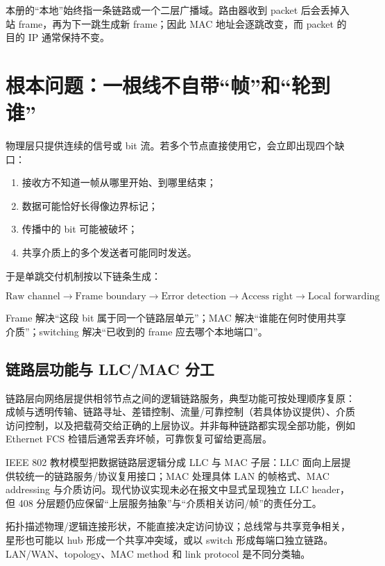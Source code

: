 \documentclass[UTF8,fontset=none,11pt,a4paper]{ctexart}
\providecommand{\tightlist}{\setlength{\itemsep}{0pt}\setlength{\parskip}{0pt}}
\begin{document}
本册的“本地”始终指一条链路或一个二层广播域。路由器收到 packet 后会丢掉入站
frame，再为下一跳生成新 frame；因此 MAC 地址会逐跳改变，而 packet 的目的 IP
通常保持不变。

\section{根本问题：一根线不自带``帧''和``轮到谁''}\label{1-ux6839ux672cux95eeux9898ux4e00ux6839ux7ebfux4e0dux81eaux5e26ux5e27ux548cux8f6eux5230ux8c01}

物理层只提供连续的信号或 bit
流。若多个节点直接使用它，会立即出现四个缺口：

\begin{enumerate}
\def\labelenumi{\arabic{enumi}.}
\tightlist
\item
  接收方不知道一帧从哪里开始、到哪里结束；
\item
  数据可能恰好长得像边界标记；
\item
  传播中的 bit 可能被破坏；
\item
  共享介质上的多个发送者可能同时发送。
\end{enumerate}

于是单跳交付机制按以下链条生成：

\[
\boxed{
\text{Raw channel}
\to \text{Frame boundary}
\to \text{Error detection}
\to \text{Access right}
\to \text{Local forwarding}
}
\]

Frame 解决``这段 bit 属于同一个链路层单元''；MAC
解决``谁能在何时使用共享介质''；switching 解决``已收到的 frame
应去哪个本地端口''。

\subsection{链路层功能与 LLC/MAC 分工}

链路层向网络层提供相邻节点之间的逻辑链路服务，典型功能可按处理顺序复原：成帧与透明传输、链路寻址、差错控制、流量/可靠控制（若具体协议提供）、介质访问控制，以及把载荷交给正确的上层协议。并非每种链路都实现全部功能，例如 Ethernet FCS 检错后通常丢弃坏帧，可靠恢复可留给更高层。

IEEE 802 教材模型把数据链路层逻辑分成 LLC 与 MAC 子层：LLC 面向上层提供较统一的链路服务/协议复用接口；MAC 处理具体 LAN 的帧格式、MAC addressing 与介质访问。现代协议实现未必在报文中显式呈现独立 LLC header，但 408 分层题仍应保留“上层服务抽象”与“介质相关访问/帧”的责任分工。

拓扑描述物理/逻辑连接形状，不能直接决定访问协议；总线常与共享竞争相关，星形也可能以 hub 形成一个共享冲突域，或以 switch 形成每端口独立链路。LAN/WAN、topology、MAC method 和 link protocol 是不同分类轴。
\end{document}
